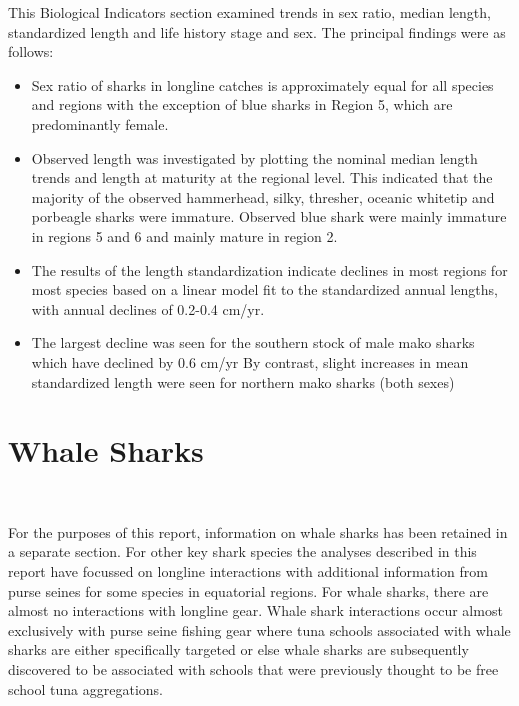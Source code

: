 \documentclass[12pt]{SCreport}
\begin{document}
This Biological Indicators section examined trends in sex ratio, median length, standardized length and life history stage and sex.  The principal findings were as follows:
\begin{itemize}
\item Sex ratio of sharks in longline catches is approximately equal for all species and regions with the exception of blue sharks in Region 5, which are predominantly female.
\item Observed length was investigated by plotting the nominal median length trends and length at
maturity at the regional level. This indicated that the majority of the observed hammerhead, silky,
thresher, oceanic whitetip and porbeagle sharks were immature. Observed blue shark were mainly
immature in regions 5 and 6 and mainly mature in region 2.
\item The results of the length standardization indicate declines in most regions for most species based
on a linear model fit to the standardized annual lengths, with annual declines of 0.2-0.4 cm/yr.
\item The largest decline was seen for the southern stock of male mako sharks which have declined by 0.6 cm/yr
By contrast, slight increases in mean standardized length were seen for northern mako sharks (both sexes)
\end{itemize}

      
 \clearpage     
  
\section{Whale Sharks}
\\ 


For the purposes of this report, information on whale sharks has been retained in a separate section. For other key shark species the analyses described in this report have focussed on longline interactions with additional information from purse seines for some species in equatorial regions. For whale sharks, there are almost no interactions with longline gear. Whale shark interactions occur almost exclusively with purse seine fishing gear where tuna schools associated with whale sharks are either specifically targeted or else whale sharks are subsequently discovered to be associated with schools that were previously thought to be free school tuna aggregations.
\end{document}
